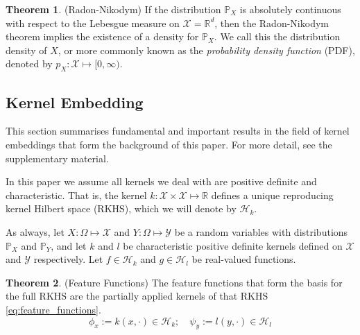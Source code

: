 \documentclass[twoside]{article} \usepackage{aistats2017}
\theoremstyle{definition}
\newtheorem{theorem}{Theorem}[section]
\newcommand{\rv}[1]{{#1}}
\newcommand{\Hk}{\mathcal{H}_{k}}
\newcommand{\Hl}{\mathcal{H}_{l}}
\begin{document}
	\begin{theorem} \label{thm:radon_nikodym}
		(Radon-Nikodym)
		If the distribution $\mathbb{P}_{\rv{X}}$ is absolutely continuous with respect to the Lebesgue measure on $\mathcal{X} = \mathbb{R}^{d}$, then the Radon-Nikodym theorem implies the existence of a density for $\mathbb{P}_{\rv{X}}$. We call this the distribution density of $\rv{X}$, or more commonly known as the \textit{probability density function} (PDF), denoted by $p_{\rv{X}}: \mathcal{X} \mapsto [0, \infty)$.
	\end{theorem}
		
	\subsection{Kernel Embedding}
	\label{sec:background:kernel_embedding}
	
	This section summarises fundamental and important results in the field of kernel embeddings that form the background of this paper. For more detail, see the supplementary material.
	
%	
%		
		In this paper we assume all kernels we deal with are positive definite and characteristic. That is, the kernel $k : \mathcal{X} \times \mathcal{X} \mapsto \mathbb{R}$ defines a unique reproducing kernel Hilbert space (RKHS), which we will denote by $\mathcal{H}_{k}$.
		
		As always, let $\rv{X} : \Omega \mapsto \mathcal{X}$ and $\rv{Y} : \Omega \mapsto \mathcal{Y}$ be a random variables with distributions $\mathbb{P}_{\rv{X}}$ and $\mathbb{P}_{\rv{Y}}$, and let $k$ and $l$ be characteristic positive definite kernels defined on $\mathcal{X}$ and $\mathcal{Y}$ respectively. Let $f \in \Hk$ and $g \in \Hl$ be real-valued functions.
		
		\begin{theorem} \label{thm:feature_functions}
			(Feature Functions)
			The feature functions that form the basis for the full RKHS are the partially applied kernels of that RKHS \eqref{eq:feature_functions}.
			\begin{equation}
				\phi_{x} := k(x, \cdot) \in \Hk ;\quad \psi_{y} := l(y, \cdot) \in \Hl
			\label{eq:feature_functions}
			\end{equation}
		\end{theorem}
		
\end{document}
